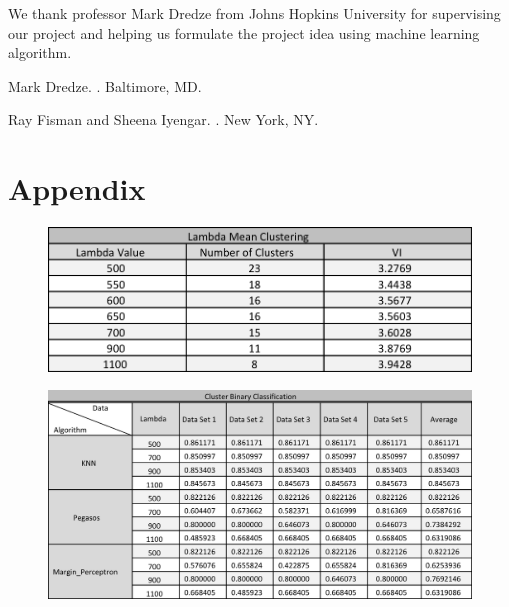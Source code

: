 \documentclass[11pt,letterpaper]{article}
\begin{document}
We thank professor Mark Dredze from Johns Hopkins University for supervising our project and helping us formulate the project idea using  machine learning algorithm.

\begin{thebibliography}{}

Mark Dredze.
.
\newblock Baltimore, MD.

Ray Fisman and Sheena Iyengar.
.
\newblock New York, NY.
\end{thebibliography}

\section*{Appendix}

\pagebreak

\vspace{1cm}

\begin{figure}
  \includegraphics[width=\linewidth]{data_2.png}
  \label{fig:data_2}
\end{figure}

\begin{figure}
  \includegraphics[width=\linewidth]{data_3.png}
  \label{fig:data_3}
\end{figure}
\end{document}
